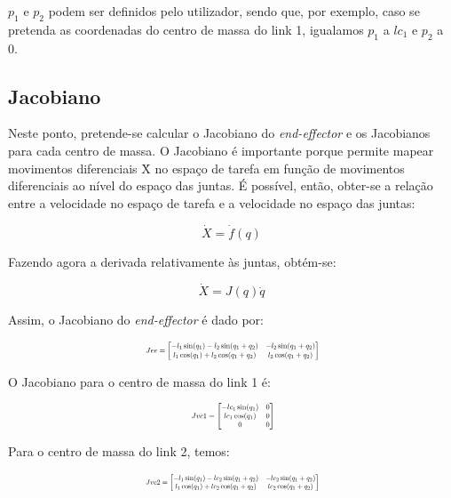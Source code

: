 \documentclass[a4paper,twocolumn,final,11pt]{article}
\begin{document}
$p_1$ e $p_2$ podem ser definidos pelo utilizador, sendo que, por exemplo, caso se pretenda as coordenadas do centro de massa do link 1, igualamos $p_1$  a $lc_1$ e $p_2$  a 0.

\subsection{Jacobiano}
Neste ponto, pretende-se calcular o Jacobiano do \textit{end-effector} e os Jacobianos para cada centro de massa. O Jacobiano é importante porque permite mapear movimentos diferenciais \.{X} no espaço de tarefa em função de movimentos diferenciais ao nível do espaço das juntas.
É possível, então, obter-se a relação entre a velocidade no espaço de tarefa e a velocidade no espaço das juntas: 

\begin{equation}
    \dot{X} = \dot{f}(q)
\end{equation}

Fazendo agora a derivada relativamente às juntas, obtém-se:

\begin{equation}
    \dot{X} = J(q)\dot{q}
\end{equation}

Assim, o Jacobiano do \textit{end-effector} é dado por: 

\begin{equation}
\resizebox{.41\textwidth}{!}{
$Jee=
\begin{bmatrix}
-l_1\sin(q_1) -l_2\sin(q_1+q_2) & -l_2 \sin(q_1+q_2) \\
l_1 \cos(q_1) +l_2 \cos(q_1+q_2) & l_2 \cos(q_1+q_2)
\end{bmatrix}$}
\end{equation}

O Jacobiano para o centro de massa do link 1 é:

\begin{equation}
\resizebox{.2\textwidth}{!}{
$Jvc1=
\begin{bmatrix}
-lc_1 \sin(q_1)  & 0 \\
lc_1 \cos(q_1)  & 0 \\
0 & 0
\end{bmatrix}$}
\end{equation}

Para o centro de massa do link 2, temos:

\begin{equation}
\resizebox{.41\textwidth}{!}{
$Jvc2=
\begin{bmatrix}
-l_1 \sin(q_1)-lc_2 \sin(q_1+q_2)  & -lc_2 \sin(q_1+q_2) \\
 l_1 \cos(q_1)+lc_2 \cos(q_1+q_2) & lc_2 \cos(q_1+q_2)
\end{bmatrix}$}
\end{equation}
\end{document}
